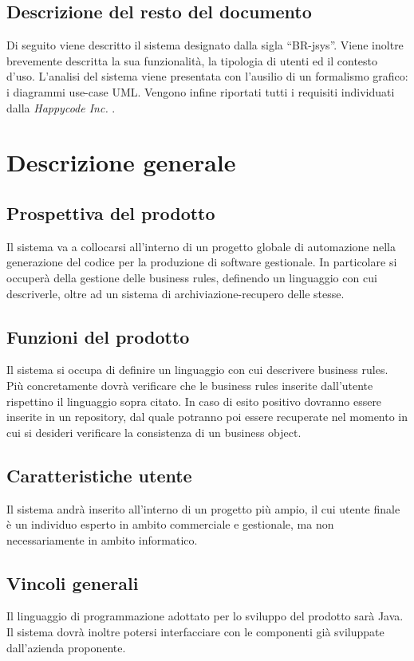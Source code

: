 \section{Descrizione del resto del documento}
Di seguito viene descritto il sistema designato dalla sigla ``BR-jsys''. Viene inoltre brevemente descritta la sua funzionalit\`a, la tipologia di utenti ed il contesto d'uso. L'analisi del sistema viene presentata con l'ausilio di un formalismo grafico: i diagrammi use-case UML. Vengono infine riportati tutti i requisiti individuati dalla \textit{Happycode Inc.} .

\chapter{Descrizione generale}
\section{Prospettiva del prodotto}
Il sistema va a collocarsi all'interno di un progetto globale di automazione nella generazione del codice per la produzione di software gestionale. In particolare si occuper\`a della gestione delle business rules, definendo un linguaggio con cui descriverle, oltre ad un sistema di archiviazione-recupero delle stesse.
\section{Funzioni del prodotto}
Il sistema si occupa di definire un linguaggio con cui descrivere business rules. Pi\`u concretamente dovr\`a verificare che le business rules inserite dall'utente rispettino il linguaggio sopra citato. In caso di esito positivo dovranno essere inserite in un repository, dal quale potranno poi essere recuperate nel momento in cui si desideri verificare la consistenza di un business object.
\section{Caratteristiche utente}
Il sistema andr\`a inserito all'interno di un progetto pi\`u ampio, il cui utente finale \`e un individuo esperto in ambito commerciale e gestionale, ma non necessariamente in ambito informatico.
\section{Vincoli generali}
Il linguaggio di programmazione adottato per lo sviluppo del prodotto sar\`a Java. Il sistema dovr\`a inoltre potersi interfacciare con le componenti gi\`a sviluppate dall'azienda proponente. 
